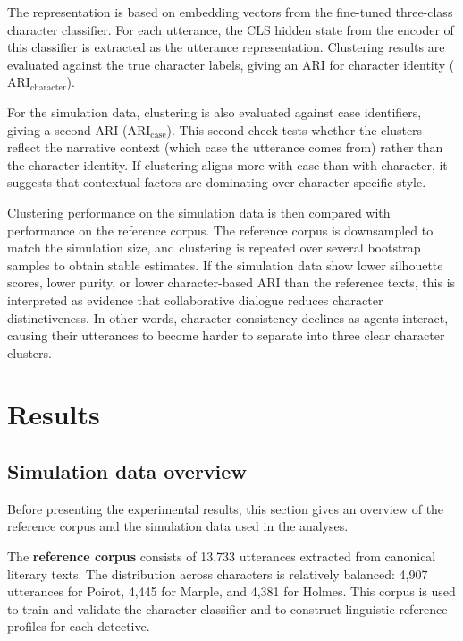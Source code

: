 \documentclass{article}
\begin{document}
The representation is based on embedding vectors from the fine-tuned three-class character classifier. For each utterance, the CLS hidden state from the encoder of this classifier is extracted as the utterance representation. Clustering results are evaluated against the true character labels, giving an ARI for character identity ($\mathrm{ARI_\mathrm{character}}$). 

For the simulation data, clustering is also evaluated against case identifiers, giving a second ARI ($\mathrm{ARI_\mathrm{case}}$). This second check tests whether the clusters reflect the narrative context (which case the utterance comes from) rather than the character identity. If clustering aligns more with case than with character, it suggests that contextual factors are dominating over character-specific style.

Clustering performance on the simulation data is then compared with performance on the reference corpus. The reference corpus is downsampled to match the simulation size, and clustering is repeated over several bootstrap samples to obtain stable estimates. If the simulation data show lower silhouette scores, lower purity, or lower character-based ARI than the reference texts, this is interpreted as evidence that collaborative dialogue reduces character distinctiveness. In other words, character consistency declines as agents interact, causing their utterances to become harder to separate into three clear character clusters.


\section{Results} \label{sec:results}

\subsection{Simulation data overview} \label{sec:results_data-overview}

Before presenting the experimental results, this section gives an overview of the reference corpus and the simulation data used in the analyses. 

The \textbf{reference corpus} consists of 13,733 utterances extracted from canonical literary texts. The distribution across characters is relatively balanced: 4,907 utterances for Poirot, 4,445 for Marple, and 4,381 for Holmes. This corpus is used to train and validate the character classifier and to construct linguistic reference profiles for each detective.
\end{document}
